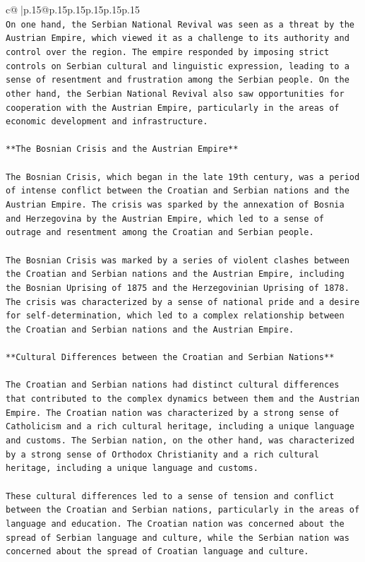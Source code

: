 \documentclass{article}
\begin{document}
{\begin{supertabular}{c@{$\;$}|p{.15\linewidth}@{}p{.15\linewidth}p{.15\linewidth}p{.15\linewidth}p{.15\linewidth}p{.15\linewidth}}
{{{\\ 
\texttt{On one hand, the Serbian National Revival was seen as a threat by the Austrian Empire, which viewed it as a challenge to its authority and control over the region. The empire responded by imposing strict controls on Serbian cultural and linguistic expression, leading to a sense of resentment and frustration among the Serbian people. On the other hand, the Serbian National Revival also saw opportunities for cooperation with the Austrian Empire, particularly in the areas of economic development and infrastructure.} \\
\\ 
\texttt{**The Bosnian Crisis and the Austrian Empire**} \\
\\ 
\texttt{The Bosnian Crisis, which began in the late 19th century, was a period of intense conflict between the Croatian and Serbian nations and the Austrian Empire. The crisis was sparked by the annexation of Bosnia and Herzegovina by the Austrian Empire, which led to a sense of outrage and resentment among the Croatian and Serbian people.} \\
\\ 
\texttt{The Bosnian Crisis was marked by a series of violent clashes between the Croatian and Serbian nations and the Austrian Empire, including the Bosnian Uprising of 1875 and the Herzegovinian Uprising of 1878. The crisis was characterized by a sense of national pride and a desire for self{-}determination, which led to a complex relationship between the Croatian and Serbian nations and the Austrian Empire.} \\
\\ 
\texttt{**Cultural Differences between the Croatian and Serbian Nations**} \\
\\ 
\texttt{The Croatian and Serbian nations had distinct cultural differences that contributed to the complex dynamics between them and the Austrian Empire. The Croatian nation was characterized by a strong sense of Catholicism and a rich cultural heritage, including a unique language and customs. The Serbian nation, on the other hand, was characterized by a strong sense of Orthodox Christianity and a rich cultural heritage, including a unique language and customs.} \\
\\ 
\texttt{These cultural differences led to a sense of tension and conflict between the Croatian and Serbian nations, particularly in the areas of language and education. The Croatian nation was concerned about the spread of Serbian language and culture, while the Serbian nation was concerned about the spread of Croatian language and culture.} \\
}}}
\end{supertabular}}
\end{document}
